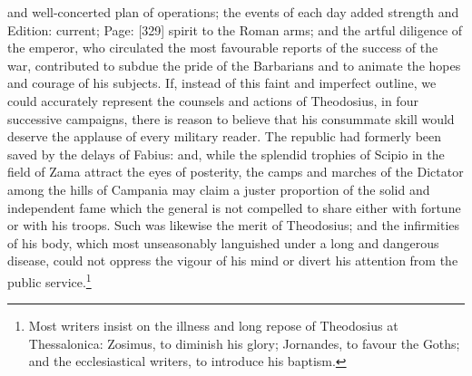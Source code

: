 and well-concerted plan of operations; the events of each day added strength and Edition: current; Page: [329] spirit to the Roman arms; and the artful diligence of the emperor, who circulated the most favourable reports of the success of the war, contributed to subdue the pride of the Barbarians and to animate the hopes and courage of his subjects. If, instead of this faint and imperfect outline, we could accurately represent the counsels and actions of Theodosius, in four successive campaigns, there is reason to believe that his consummate skill would deserve the applause of every military reader. The republic had formerly been saved by the delays of Fabius: and, while the splendid trophies of Scipio in the field of Zama attract the eyes of posterity, the camps and marches of the Dictator among the hills of Campania may claim a juster proportion of the solid and independent fame which the general is not compelled to share either with fortune or with his troops. Such was likewise the merit of Theodosius; and the infirmities of his body, which most unseasonably languished under a long and dangerous disease, could not oppress the vigour of his mind or divert his attention from the public service.\footnote{Most writers insist on the illness and long repose of Theodosius at Thessalonica: Zosimus, to diminish his glory; Jornandes, to favour the Goths; and the ecclesiastical writers, to introduce his baptism.}

